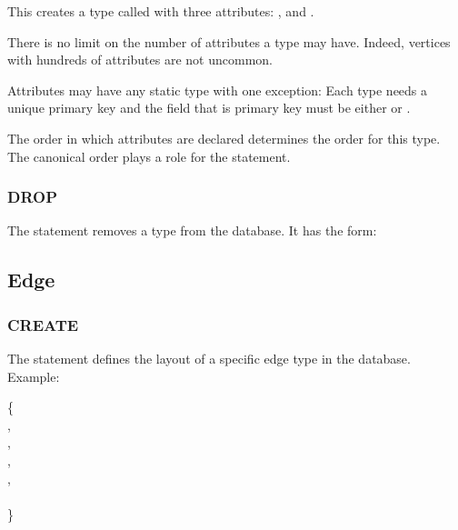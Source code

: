 This creates a type called 
with three attributes:
,  and .

There is no limit on the number of attributes
a type may have. Indeed, vertices with hundreds
of attributes are not uncommon.

Attributes may have any static type with one exception:
Each type needs a unique primary key and the field
that is primary key must be either
 or .

The order in which attributes are declared
determines the  order for this type.
The canonical order plays a role for the 
statement.

\subsubsection{DROP}
The  statement removes a type
from the database. 
It has the form:

 

\subsection{Edge}
\subsubsection{CREATE}
The  statement defines the layout
of a specific edge type in the database.
Example:

  \{ \\
\hspace*{1cm}    , \\
\hspace*{1cm}    , \\
\hspace*{1cm}  , \\
\hspace*{1cm}    , \\
\hspace*{1cm}     \\
\}

